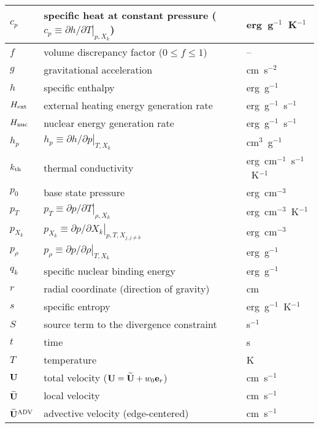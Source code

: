 \begin{center}
\begin{longtable}{|l|p{4.0in}|l|}
$c_p$   & specific heat at constant pressure
          ($c_p \equiv \left . \partial h / \partial T \right |_{p,X_k}$)
        & erg~g$^{-1}$~K$^{-1}$ \\
\hline
$f$     & volume discrepancy factor ($0 \le f \le 1$) & -- \\
\hline
$g$     & gravitational acceleration                 & cm~s$^{-2}$ \\
\hline
$h$     & specific enthalpy                          & erg~g$^{-1}$ \\
\hline
${H_{\rm ext}}$ & external heating energy generation rate    & erg~g$^{-1}$~s$^{-1}$ \\
\hline
${H_{\rm nuc}}$ & nuclear energy generation rate             & erg~g$^{-1}$~s$^{-1}$ \\
\hline
$h_p$   & $h_p \equiv \left . \partial h / \partial p \right |_{T,X_k}$ & cm$^{3}$~g$^{-1}$ \\
\hline
$k_{\rm th}$  & thermal conductivity                       & erg~cm$^{-1}$~s$^{-1}$~K$^{-1}$ \\
\hline
$p_0$   & base state pressure                        & erg~cm$^{-3}$ \\
\hline
$p_T$   & $p_T \equiv \left . \partial p / \partial T \right |_{\rho,X_k}$ & erg~cm$^{-3}$~K$^{-1}$ \\
\hline
$p_{X_k}$ & $p_{X_k} \equiv \left . \partial p / \partial X_k \right |_{p,T,X_{j,j\ne k}}$ & erg~cm$^{-3}$ \\
\hline
$p_\rho$ & $p_\rho \equiv \left . \partial p / \partial \rho \right |_{T,X_k}$ & erg~g$^{-1}$ \\
\hline
$q_k$   & specific nuclear binding energy            & erg~g$^{-1}$  \\
\hline
$r$     & radial coordinate (direction of gravity)   & cm \\
\hline
$s$     & specific entropy                           & erg~g$^{-1}$~K$^{-1}$ \\
\hline
$S$     & source term to the divergence constraint   & s$^{-1}$ \\
\hline
$t$     & time                                       & s \\
\hline
$T$     & temperature                                & K \\
\hline
${\bf U}$     & total velocity (${\bf U} = \widetilde{{\bf U}} + w_0 {\bf e}_r$) & cm~s$^{-1}$ \\
\hline
$\widetilde{{\bf U}}$   & local velocity                             & cm~s$^{-1}$ \\
\hline
$\widetilde{\mathbf{U}}^{\mathrm{ADV}}$ & advective velocity (edge-centered)         & cm~s$^{-1}$ \\

\end{longtable}
\end{center}
